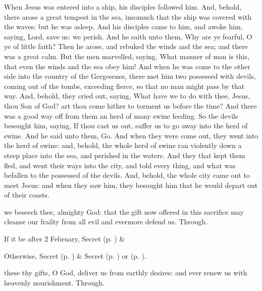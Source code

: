  When Jesus was entered into a ship, his disciples followed him. And, behold, there arose a great tempest in the sea, insomuch that the ship was covered with the waves: but he was asleep. And his disciples came to him, and awoke him, saying, Lord, save us: we perish. And he saith unto them, Why are ye fearful, O ye of little faith? Then he arose, and rebuked the winds and the sea; and there was a great calm. But the men marvelled, saying, What manner of man is this, that even the winds and the sea obey him! And when he was come to the other side into the country of the Gergesenes, there met him two possessed with devils, coming out of the tombs, exceeding fierce, so that no man might pass by that way. And, behold, they cried out, saying, What have we to do with thee, Jesus, thou Son of God? art thou come hither to torment us before the time? And there was a good way off from them an herd of many swine feeding. So the devils besought him, saying, If thou cast us out, suffer us to go away into the herd of swine. And he said unto them, Go. And when they were come out, they went into the herd of swine: and, behold, the whole herd of swine ran violently down a steep place into the sea, and perished in the waters. And they that kept them fled, and went their ways into the city, and told every thing, and what was befallen to the possessed of the devils. And, behold, the whole city came out to meet Jesus: and when they saw him, they besought him that he would depart out of their coasts.


\secret
{} we beseech thee, almighty God: that the gift now offered in this sacrifice may cleanse our frailty from all evil and evermore defend us. Through.
\begin{rubric}
    If it be after 2 February,  Secret  (p. \pageref{SPSaints}) \&  
\end{rubric}
\begin{rubric}
	Otherwise,  Secret  (p. \pageref{SPMaryPostChristmas}) \&  Secret  (p. \pageref{SPAgainst}) or  (p. \pageref{SPChiefBishop}).
\end{rubric}
\postcommunion
{} these thy gifts, O God, deliver us from earthly desires: and ever renew us with heavenly nourishment. Through.

